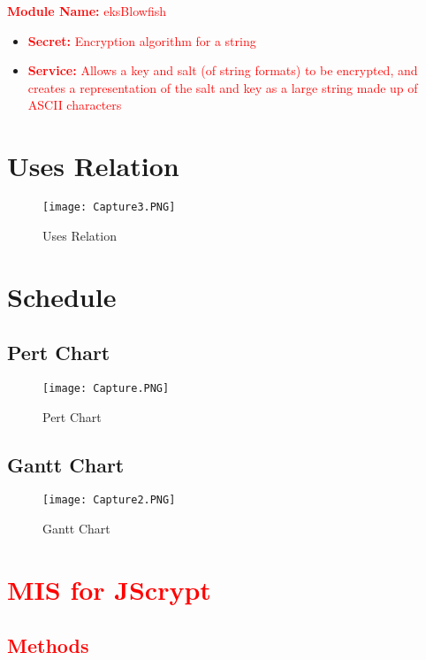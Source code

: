 \documentclass[12pt]{article}
\begin{document}
  \noindent\textcolor{red}{\textbf{Module Name:} eksBlowfish}
  \begin{itemize}
    \item \textcolor{red}{\textbf{Secret:} Encryption algorithm for a string }
    \item \textcolor{red}{\textbf{Service:} Allows a key and salt (of string formats) to be encrypted, and creates a representation of the salt and key as a large string made up of ASCII characters}
  \end{itemize}

  


\section{Uses Relation}

  \begin{figure}[H]

  \centerline{\texttt{[image: Capture3.PNG]}}
  \caption{Uses Relation}
  \end{figure}


\section{Schedule}

\subsection{Pert Chart}


  \begin{figure}[H]
  \centerline{\texttt{[image: Capture.PNG]}}
  \caption{Pert Chart}
  \end{figure}

\subsection{Gantt Chart}

  \begin{figure}[H]
  \centerline{\texttt{[image: Capture2.PNG]}}
  \caption{Gantt Chart}
  \end{figure}



 \section{\textcolor{red}{MIS for JScrypt}}

 \subsection{\textcolor{red}{Methods}}
\end{document}
